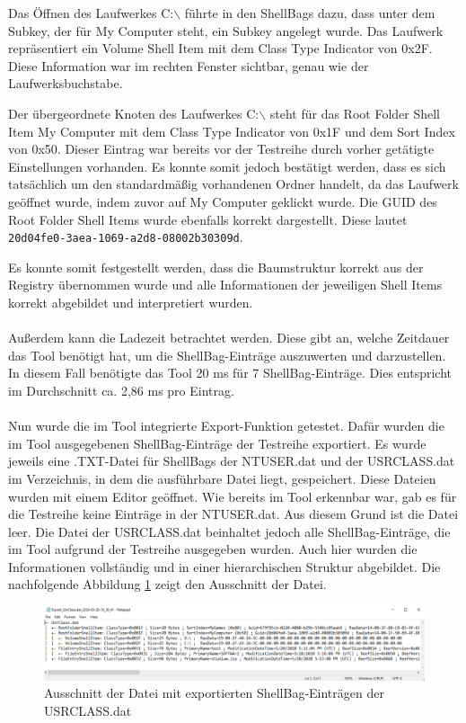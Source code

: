 Das Öffnen des Laufwerkes C:$\backslash$ führte in den ShellBags dazu, dass unter dem Subkey, der für \glqq My Computer\grqq{} steht, ein Subkey angelegt wurde. Das Laufwerk repräsentiert ein Volume Shell Item mit dem Class Type Indicator von 0x2F. Diese Information war im rechten Fenster sichtbar, genau wie der Laufwerksbuchstabe.

Der übergeordnete Knoten des Laufwerkes C:$\backslash$ steht für das Root Folder Shell Item \glqq My Computer\grqq{} mit dem Class Type Indicator von 0x1F und dem Sort Index von 0x50. Dieser Eintrag war bereits vor der Testreihe durch vorher getätigte Einstellungen vorhanden. Es konnte somit jedoch bestätigt werden, dass es sich tatsächlich um den standardmäßig vorhandenen Ordner handelt, da das Laufwerk geöffnet wurde, indem zuvor auf \glqq My Computer\grqq{} geklickt wurde. Die GUID des Root Folder Shell Items wurde ebenfalls korrekt dargestellt. Diese lautet \texttt{20d04fe0-3aea-1069-a2d8-08002b30309d}.

Es konnte somit festgestellt werden, dass die Baumstruktur korrekt aus der Registry übernommen wurde und alle Informationen der jeweiligen Shell Items korrekt abgebildet und interpretiert wurden. \\
\\
Außerdem kann die Ladezeit betrachtet werden. Diese gibt an, welche Zeitdauer das Tool benötigt hat, um die ShellBag-Einträge auszuwerten und darzustellen. In diesem Fall benötigte das Tool 20 ms für 7 ShellBag-Einträge. Dies entspricht im Durchschnitt ca. 2,86 ms pro Eintrag. \\
\\
Nun wurde die im Tool integrierte Export-Funktion getestet. Dafür wurden die im Tool ausgegebenen ShellBag-Einträge der Testreihe exportiert. Es wurde jeweils eine .TXT-Datei für ShellBags der NTUSER.dat und der USRCLASS.dat im Verzeichnis, in dem die ausführbare Datei liegt, gespeichert. Diese Dateien wurden mit einem Editor geöffnet. Wie bereits im Tool erkennbar war, gab es für die Testreihe keine Einträge in der NTUSER.dat. Aus diesem Grund ist die Datei leer. Die Datei der USRCLASS.dat beinhaltet jedoch alle ShellBag-Einträge, die im Tool aufgrund der Testreihe ausgegeben wurden. Auch hier wurden die Informationen vollständig und in einer hierarchischen Struktur abgebildet. Die nachfolgende Abbildung \ref{img:export} zeigt den Ausschnitt der Datei. 

\begin{figure}[H]
	\centering
	\includegraphics[width=1\textwidth]{part/export.png}
	\caption{Ausschnitt der Datei mit exportierten ShellBag-Einträgen der USRCLASS.dat} 
	\label{img:export}
\end{figure}


